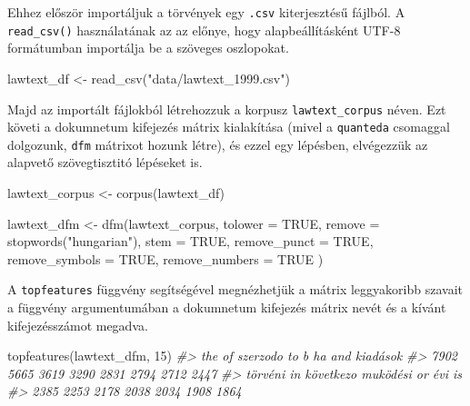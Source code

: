 \documentclass[
]{book}
\newenvironment{Shaded}{\begin{snugshade}}{\end{snugshade}}
\newcommand{\AttributeTok}[1]{\textcolor[rgb]{0.77,0.63,0.00}{#1}}
\newcommand{\CommentTok}[1]{\textcolor[rgb]{0.56,0.35,0.01}{\textit{#1}}}
\newcommand{\ConstantTok}[1]{\textcolor[rgb]{0.00,0.00,0.00}{#1}}
\newcommand{\DecValTok}[1]{\textcolor[rgb]{0.00,0.00,0.81}{#1}}
\newcommand{\FunctionTok}[1]{\textcolor[rgb]{0.00,0.00,0.00}{#1}}
\newcommand{\NormalTok}[1]{#1}
\newcommand{\OtherTok}[1]{\textcolor[rgb]{0.56,0.35,0.01}{#1}}
\newcommand{\StringTok}[1]{\textcolor[rgb]{0.31,0.60,0.02}{#1}}
\begin{document}
Ehhez először importáljuk a törvények egy \texttt{.csv} kiterjesztésű
fájlból. A \texttt{read\_csv()} használatának az az előnye, hogy
alapbeállításként UTF-8 formátumban importálja be a szöveges oszlopokat.

\begin{Shaded}
\begin{Highlighting}[]

\NormalTok{lawtext\_df }\OtherTok{\textless{}{-}} \FunctionTok{read\_csv}\NormalTok{(}\StringTok{"data/lawtext\_1999.csv"}\NormalTok{)}
\end{Highlighting}
\end{Shaded}

Majd az importált fájlokból létrehozzuk a korpusz
\texttt{lawtext\_corpus} néven. Ezt követi a dokumnetum kifejezés mátrix
kialakítása (mivel a \texttt{quanteda} csomaggal dolgozunk, \texttt{dfm}
mátrixot hozunk létre), és ezzel egy lépésben, elvégezzük az alapvető
szövegtisztitó lépéseket is.

\begin{Shaded}
\begin{Highlighting}[]

\NormalTok{lawtext\_corpus }\OtherTok{\textless{}{-}} \FunctionTok{corpus}\NormalTok{(lawtext\_df)}

\NormalTok{lawtext\_dfm }\OtherTok{\textless{}{-}} \FunctionTok{dfm}\NormalTok{(lawtext\_corpus,}
  \AttributeTok{tolower =} \ConstantTok{TRUE}\NormalTok{, }\AttributeTok{remove =}
    \FunctionTok{stopwords}\NormalTok{(}\StringTok{"hungarian"}\NormalTok{), }\AttributeTok{stem =} \ConstantTok{TRUE}\NormalTok{, }\AttributeTok{remove\_punct =} \ConstantTok{TRUE}\NormalTok{, }\AttributeTok{remove\_symbols =} \ConstantTok{TRUE}\NormalTok{, }\AttributeTok{remove\_numbers =} \ConstantTok{TRUE}
\NormalTok{)}
\end{Highlighting}
\end{Shaded}

A \texttt{topfeatures} függvény segítségével megnézhetjük a mátrix
leggyakoribb szavait a függvény argumentumában a dokumnetum kifejezés
mátrix nevét és a kívánt kifejezésszámot megadva.

\begin{Shaded}
\begin{Highlighting}[]

\FunctionTok{topfeatures}\NormalTok{(lawtext\_dfm, }\DecValTok{15}\NormalTok{)}
\CommentTok{\#\textgreater{}       the        of  szerzodo        to         b        ha       and  kiadások }
\CommentTok{\#\textgreater{}      7902      5665      3619      3290      2831      2794      2712      2447 }
\CommentTok{\#\textgreater{}   törvéni        in következo  muködési        or       évi        is }
\CommentTok{\#\textgreater{}      2385      2253      2178      2038      2034      1908      1864}
\end{Highlighting}
\end{Shaded}
\end{document}
